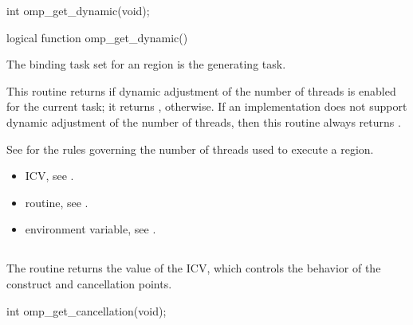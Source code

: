 \format
\ccppspecificstart
\begin{boxedcode}
int omp\_get\_dynamic(void);
\end{boxedcode}
\ccppspecificend

\fortranspecificstart
\begin{boxedcode}
logical function omp\_get\_dynamic()
\end{boxedcode}
\fortranspecificend

\binding
The binding task set for an  region is the generating task. 

\effect
This routine returns  if dynamic adjustment of the number of threads is enabled for 
the current task; it returns , otherwise. If an implementation does not support 
dynamic adjustment of the number of threads, then this routine always returns .

See  
for the rules governing the number of threads used to 
execute a  region. 

\crossreferences
\begin{itemize}
\item {} ICV, see 
.

\item {} routine, see 
.

\item {} environment variable, see 
.
\end{itemize}









\subsection{}
\label{subsec:omp_get_cancellation}
\summary
The  routine returns the value of the  ICV, which 
controls the behavior of the  construct and cancellation points.

\format
\ccppspecificstart
\begin{boxedcode}
int omp\_get\_cancellation(void);
\end{boxedcode}
\ccppspecificend

